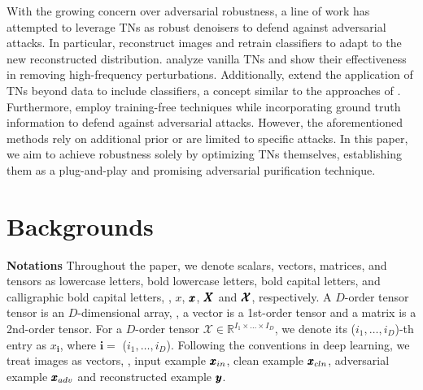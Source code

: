 With the growing concern over adversarial robustness, a line of work has attempted to leverage TNs as robust denoisers to defend against adversarial attacks. In particular, \citet{yang2019me} reconstruct images and retrain classifiers to adapt to the new reconstructed distribution. \citet{entezari2022tensorshield} analyze vanilla TNs and show their effectiveness in removing high-frequency perturbations.
Additionally, \citep{bhattarai2023robust} extend the application of TNs beyond data to include classifiers, a concept similar to the approaches of \citep{rudkiewicz2024robustness,phan2023cstar}. Furthermore, \citep{song2024training} employ training-free techniques while incorporating ground truth information to defend against adversarial attacks. However, the aforementioned methods rely on additional prior or are limited to specific attacks.
In this paper, we aim to achieve robustness solely by optimizing TNs themselves, establishing them as a plug-and-play and promising adversarial purification technique.

\section{Backgrounds}
\label{Backgrounds}


\textbf{Notations} \quad Throughout the paper, we denote scalars, vectors, matrices, and tensors as lowercase letters, bold lowercase letters, bold capital letters, and calligraphic bold capital letters, \eg, $x$, $\pmb{x}$, $\pmb{X}$ and $\pmb{\mathcal{X}}$, respectively.
A $D$-order tensor tensor is an $D$-dimensional array, \eg, a vector is a 1st-order tensor and a matrix is a 2nd-order tensor.
For a $D$-order tensor $\pmb{\mathcal{X}} \in \mathbb{R}^{I_1 \times \dots \times I_D}$, we denote its ($i_1,\dots,i_D$)-th entry as $x_{\mathbf{i}}$, where $\mathbf{i} =$ ($i_1,\dots,i_D$).
Following the conventions in deep learning, we treat images as vectors, \eg, input example $\pmb{x}_{in}$, clean example $\pmb{x}_{cln}$, adversarial example $\pmb{x}_{adv}$ and reconstructed example $\pmb{y}$.

